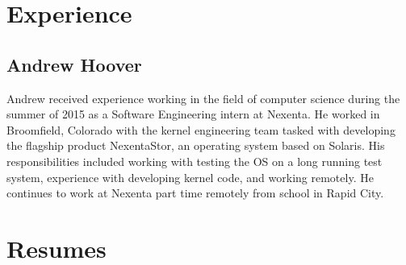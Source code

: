 
\section{Experience}

\subsection{Andrew Hoover}

Andrew received experience working in the field of computer science during the summer of 2015 as a Software Engineering intern at Nexenta. He worked in Broomfield, Colorado with the kernel engineering team tasked with developing the flagship product NexentaStor, an operating system based on Solaris. His responsibilities included working with testing the OS on a long running test system, experience with developing kernel code, and working remotely. He continues to work at Nexenta part time remotely from school in Rapid City.


\section{Resumes}



     
     



% 


% 


% 



